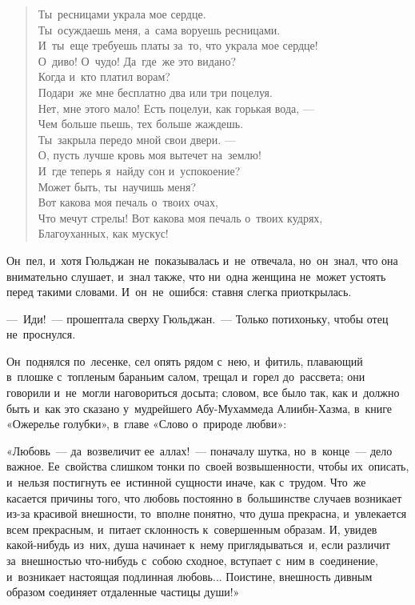\documentclass[12pt,a4paper]{book}
\begin{document}
\begin{verse}
Ты~ресницами украла мое сердце. \\
Ты~осуждаешь меня, а~сама воруешь ресницами. \\
И~ты~еще требуешь платы за~то, что украла мое сердце! \\
О~диво! О~чудо! Да~где~же это видано? \\
Когда и~кто платил ворам? \\
Подари~же мне бесплатно два или три поцелуя. \\
Нет, мне этого мало! Есть поцелуи, как горькая вода, --- \\
Чем больше пьешь, тех больше жаждешь. \\
Ты~закрыла передо мной свои двери. --- \\
О, пусть лучше кровь моя вытечет на~землю! \\
И~где теперь я~найду сон и~успокоение? \\
Может быть, ты~научишь меня? \\
Вот какова моя печаль о~твоих очах, \\
Что мечут стрелы! Вот какова моя печаль о~твоих кудрях, \\
Благоуханных, как мускус!
\end{verse}

Он~пел, и~хотя Гюльджан не~показывалась и~не~отвечала, но~он~знал, что она внимательно слушает, и~знал также, что ни~одна женщина не~может устоять перед такими словами. И~он~не~ошибся: ставня слегка приоткрылась.

—~Иди!~— прошептала сверху Гюльджан.~— Только потихоньку, чтобы отец не~проснулся.

Он~поднялся по~лесенке, сел опять рядом с~нею, и~фитиль, плавающий в~плошке с~топленым бараньим салом, трещал и~горел до~рассвета; они говорили и~не~могли наговориться досыта; словом, все было так, как и~должно быть и~как это сказано у~мудрейшего Абу-Мухаммеда Алиибн-Хазма, в~книге «Ожерелье голубки», в~главе «Слово о~природе любви»:

«Любовь~— да~возвеличит ее~аллах!~— поначалу шутка, но~в~конце~— дело важное. Ее~свойства слишком тонки по~своей возвышенности, чтобы их~описать, и~нельзя постигнуть ее~истинной сущности иначе, как с~трудом. Что~же касается причины того, что любовь постоянно в~большинстве случаев возникает из-за красивой внешности, то~вполне понятно, что душа прекрасна, и~увлекается всем прекрасным, и~питает склонность к~совершенным образам. И, увидев какой-нибудь из~них, душа начинает к~нему приглядываться~и, если различит за~внешностью что-нибудь с~собою сходное, вступает с~ним в~соединение, и~возникает настоящая подлинная любовь... Поистине, внешность дивным образом соединяет отдаленные частицы души!»
\end{document}
